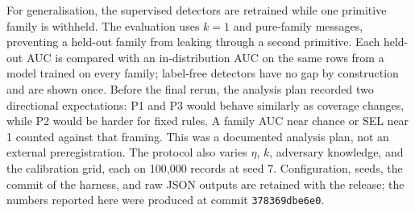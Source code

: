 \documentclass[conference]{IEEEtran}
\begin{document}
For generalisation, the supervised detectors are retrained while one
primitive family is withheld. The evaluation uses $k=1$ and pure-family
messages, preventing a held-out family from leaking through a second
primitive. Each held-out AUC is compared with an in-distribution AUC on the
same rows from a model trained on every family; label-free detectors have no
gap by construction and are shown once. Before the final rerun, the analysis
plan recorded two directional expectations: P1 and P3 would behave similarly
as coverage changes, while P2 would be harder for fixed rules. A family AUC
near chance or SEL near 1 counted against that framing. This was a documented
analysis plan, not an external preregistration. The protocol also varies
$\eta$, $k$, adversary knowledge, and the calibration grid, each on 100,000
records at seed 7. Configuration, seeds, the commit of the harness, and raw
JSON outputs are retained with the release; the numbers reported here were
produced at commit \texttt{378369dbe6e0}.
\end{document}
